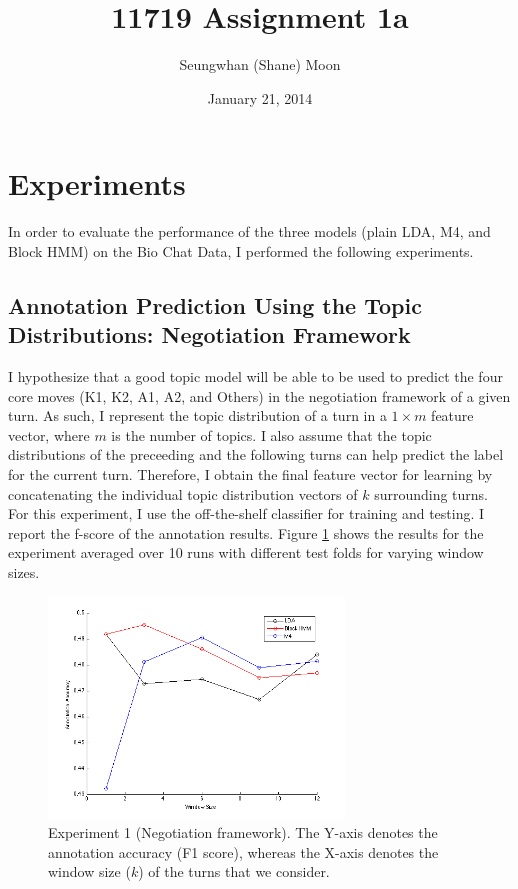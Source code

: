 \documentclass{article}
\title{11719 Assignment 1a}
\author{Seungwhan (Shane) Moon}
\date{January 21, 2014}
\begin{document}
\maketitle

\section{Experiments}

In order to evaluate the performance of the three models (plain LDA, M4, and Block HMM) on the Bio Chat Data, I performed the following experiments.

\subsection{Annotation Prediction Using the Topic Distributions: Negotiation Framework}

I hypothesize that a good topic model will be able to be used to predict the four core moves (K1, K2, A1, A2, and Others) in the negotiation framework of a given turn. As such, I represent the topic distribution of a turn in a $1 \times m$ feature vector, where $m$ is the number of topics. I also assume that the topic distributions of the preceeding and the following turns can help predict the label for the current turn. Therefore, I obtain the final feature vector for learning by concatenating the individual topic distribution vectors of $k$ surrounding turns. For this experiment, I use the off-the-shelf classifier for training and testing. I report the f-score of the annotation results. Figure \ref{fig:experiment1_1} shows the results for the experiment averaged over 10 runs with different test folds for varying window sizes.

\begin{figure}[h!]
  \centering
    \includegraphics[width=0.7\textwidth]{experiment1_1.png}
    \caption{Experiment 1 (Negotiation framework). The Y-axis denotes the annotation accuracy (F1 score), whereas the X-axis denotes the window size ($k$) of the turns that we consider.}
  \label{fig:experiment1_1}
\end{figure}
\end{document}
